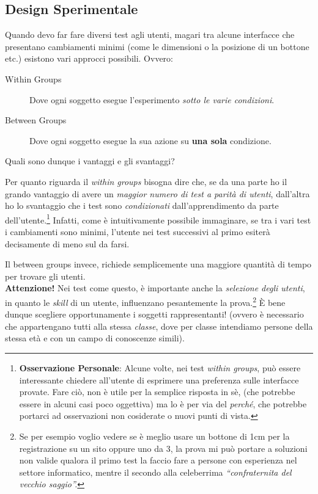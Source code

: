\documentclass[oneside]{book}
\begin{document}
		\subsection{Design Sperimentale} \label{sez:wbgroups}
			Quando devo far fare diversi test agli utenti, magari tra alcune interfacce che presentano cambiamenti minimi (come le dimensioni o la posizione di un bottone etc.) esistono vari approcci possibili. Ovvero:
			\begin{description}
			\item[Within Groups] Dove ogni soggetto esegue l'esperimento \emph{sotto le varie condizioni}.
			\item[Between Groups] Dove ogni soggetto esegue la sua azione su \textbf{una sola} condizione.
			\end{description}
			\begin{em}
			\begin{center}
			Quali sono dunque i vantaggi e gli svantaggi? 
			\end{center}
			\end{em}
			Per quanto riguarda il \emph{within groups} bisogna dire che, se da una parte ho il grando vantaggio di avere un \emph{maggior numero di test a parità di utenti}, dall'altra ho lo svantaggio che i test sono \emph{condizionati} dall'apprendimento da parte dell'utente.\footnote{\textbf{Osservazione Personale}: Alcune volte, nei test \emph{within groups}, può essere interessante chiedere all'utente di esprimere una preferenza sulle interfacce provate. Fare ciò, non è utile per la semplice risposta in sè, (che potrebbe essere in alcuni casi poco oggettiva) ma lo è per via del \emph{perché}, che potrebbe portarci ad osservazioni non cosiderate o nuovi punti di vista.
			}
			Infatti, come è intuitivamente possibile immaginare, se tra i vari test i cambiamenti sono minimi, l'utente nei test successivi al primo esiterà decisamente di meno sul da farsi.

			Il between groups invece, richiede semplicemente una maggiore quantità di tempo per trovare gli utenti. \\

			\textbf{Attenzione!} Nei test come questo, è importante anche la \emph{selezione degli utenti}, in quanto le \emph{skill} di un utente, influenzano pesantemente la prova.\footnote{ Se per esempio voglio vedere se è meglio usare un bottone di 1cm per la registrazione su un sito oppure uno da 3, la prova mi può portare a soluzioni non valide qualora il primo test la faccio fare a persone con esperienza nel settore informatico, mentre il secondo alla celeberrima \emph{``confraternita del vecchio saggio''.}} È bene dunque scegliere opportunamente i soggetti rappresentanti! (ovvero è necessario che appartengano tutti alla stessa \emph{classe}, dove per classe intendiamo persone della stessa età e con un campo di conoscenze simili).
\end{document}
